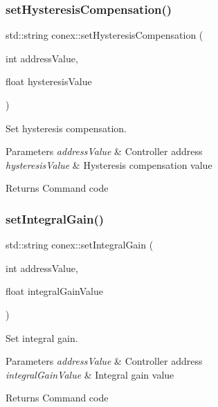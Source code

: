 \subsubsection{\texorpdfstring{set\+Hysteresis\+Compensation()}{setHysteresisCompensation()}}
{\footnotesize\ttfamily std\+::string conex\+::set\+Hysteresis\+Compensation (\begin{DoxyParamCaption}\item[{int}]{address\+Value,  }\item[{float}]{hysteresis\+Value }\end{DoxyParamCaption})}



Set hysteresis compensation. 


\begin{DoxyParams}{Parameters}
{\em address\+Value} & Controller address \\
\hline
{\em hysteresis\+Value} & Hysteresis compensation value \\
\hline
\end{DoxyParams}
\begin{DoxyReturn}{Returns}
Command code 
\end{DoxyReturn}
\mbox{\label{namespaceconex_af806b975f4f1ce8ee3e83ce660f72593}} 
\subsubsection{\texorpdfstring{set\+Integral\+Gain()}{setIntegralGain()}}
{\footnotesize\ttfamily std\+::string conex\+::set\+Integral\+Gain (\begin{DoxyParamCaption}\item[{int}]{address\+Value,  }\item[{float}]{integral\+Gain\+Value }\end{DoxyParamCaption})}



Set integral gain. 


\begin{DoxyParams}{Parameters}
{\em address\+Value} & Controller address \\
\hline
{\em integral\+Gain\+Value} & Integral gain value \\
\hline
\end{DoxyParams}
\begin{DoxyReturn}{Returns}
Command code 
\end{DoxyReturn}
\mbox{\label{namespaceconex_aa3f88891fb93e706d4be157b584a7f42}} 
